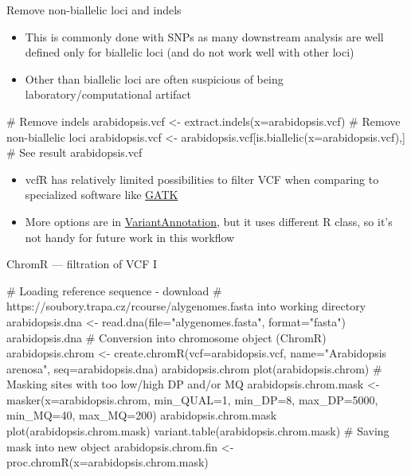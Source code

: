 \documentclass[compress, ucs, xelatex, 11pt, xcolor=svgnames, aspectratio=169,
	hyperref={
		bookmarks=true,
		unicode=true,
		colorlinks=true,
		pdftitle={Molecular data in R},
		plainpages=false,
		pdfauthor={Vojtech Zeisek},
		pdfsubject={Course about phylogeny and evolution in R},
		pdfcreator={XeLaTeX},
		pdfkeywords={R, evolution, phylogeny, molecular data},
		linkcolor=Crimson, %
		anchorcolor=Magenta, %
		citecolor=Magenta, %
		filecolor=Magenta, %
		menucolor=Magenta, %
		urlcolor=DodgerBlue, %
		pdftex},
	url={hyphens, lowtilde} %
	]{beamer}
\begin{document}
\begin{frame}[fragile]{Remove non-biallelic loci and indels}
	\begin{itemize}
		\item This is commonly done with SNPs as many downstream analysis are well defined only for biallelic loci (and do not work well with other loci)
		\item Other than biallelic loci are often suspicious of being laboratory/computational artifact
	\end{itemize}
	\begin{spluscode}
    # Remove indels
    arabidopsis.vcf <- extract.indels(x=arabidopsis.vcf)
    # Remove non-biallelic loci
    arabidopsis.vcf <- arabidopsis.vcf[is.biallelic(x=arabidopsis.vcf),]
    # See result
    arabidopsis.vcf
	\end{spluscode}
	\begin{itemize}
		\item vcfR has relatively limited possibilities to filter VCF when comparing to specialized software like \href{https://gatk.broadinstitute.org/}{GATK}
		\item More options are in \href{https://bioconductor.org/packages/release/bioc/html/VariantAnnotation.html}{VariantAnnotation}, but it uses different R class, so it's not handy for future work in this workflow
	\end{itemize}
\end{frame}

\begin{frame}[fragile]{ChromR --- filtration of VCF I}
	\begin{spluscode}
    # Loading reference sequence - download
    # https://soubory.trapa.cz/rcourse/alygenomes.fasta into working directory
    arabidopsis.dna <- read.dna(file="alygenomes.fasta", format="fasta")
    arabidopsis.dna
    # Conversion into chromosome object (ChromR)
    arabidopsis.chrom <- create.chromR(vcf=arabidopsis.vcf,
      name="Arabidopsis arenosa", seq=arabidopsis.dna)
    arabidopsis.chrom
    plot(arabidopsis.chrom)
    # Masking sites with too low/high DP and/or MQ
    arabidopsis.chrom.mask <- masker(x=arabidopsis.chrom, min_QUAL=1,
      min_DP=8, max_DP=5000, min_MQ=40, max_MQ=200)
    arabidopsis.chrom.mask
    plot(arabidopsis.chrom.mask)
    variant.table(arabidopsis.chrom.mask)
    # Saving mask into new object
    arabidopsis.chrom.fin <- proc.chromR(x=arabidopsis.chrom.mask)
	\end{spluscode}
\end{frame}
\end{document}
